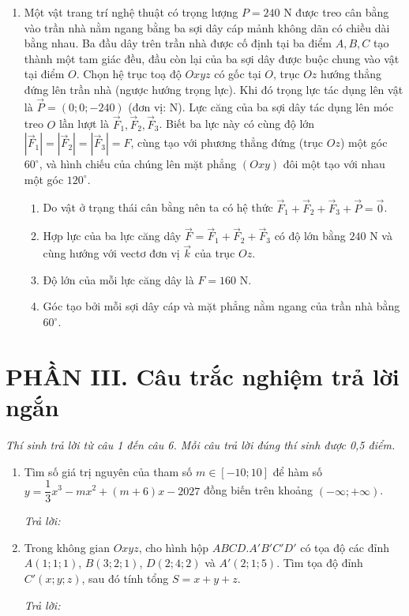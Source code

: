 \documentclass[12pt,a4paper]{article}
\newcommand{\otraloi}{\par\nobreak\smallskip\noindent\textit{Trả lời:}\quad\fbox{\rule{0pt}{11pt}\makebox[0.3cm]{}}\,\fbox{\rule{0pt}{11pt}\makebox[0.3cm]{}}\,\fbox{\rule{0pt}{11pt}\makebox[0.3cm]{}}\,\fbox{\rule{0pt}{11pt}\makebox[0.3cm]{}}}
\begin{document}
\begin{enumerate}[start=2]
\item Một vật trang trí nghệ thuật có trọng lượng $P=240\text{ N}$ được treo cân bằng vào trần nhà nằm ngang bằng ba sợi dây cáp mảnh không dãn có chiều dài bằng nhau. Ba đầu dây trên trần nhà được cố định tại ba điểm $A, B, C$ tạo thành một tam giác đều, đầu còn lại của ba sợi dây được buộc chung vào vật tại điểm $O$. Chọn hệ trục toạ độ $Oxyz$ có gốc tại $O$, trục $Oz$ hướng thẳng đứng lên trần nhà (ngược hướng trọng lực). Khi đó trọng lực tác dụng lên vật là $\vec{P}=(0;0;-240)$ (đơn vị: N). Lực căng của ba sợi dây tác dụng lên móc treo $O$ lần lượt là $\vec{F}_1, \vec{F}_2, \vec{F}_3$. Biết ba lực này có cùng độ lớn $|\vec{F}_1|=|\vec{F}_2|=|\vec{F}_3|=F$, cùng tạo với phương thẳng đứng (trục $Oz$) một góc $60^\circ$, và hình chiếu của chúng lên mặt phẳng $(Oxy)$ đôi một tạo với nhau một góc $120^\circ$.
\begin{enumerate}
\item Do vật ở trạng thái cân bằng nên ta có hệ thức $\vec{F}_1+\vec{F}_2+\vec{F}_3+\vec{P}=\vec{0}$.
\item Hợp lực của ba lực căng dây $\vec{F}=\vec{F}_1+\vec{F}_2+\vec{F}_3$ có độ lớn bằng $240\text{ N}$ và cùng hướng với vectơ đơn vị $\vec{k}$ của trục $Oz$.
\item Độ lớn của mỗi lực căng dây là $F=160\text{ N}$.
\item Góc tạo bởi mỗi sợi dây cáp và mặt phẳng nằm ngang của trần nhà bằng $60^\circ$.
\end{enumerate}
\end{enumerate}

\vspace{3pt}
\section*{\large PHẦN III. Câu trắc nghiệm trả lời ngắn}
\textit{Thí sinh trả lời từ câu 1 đến câu 6. Mỗi câu trả lời đúng thí sinh được 0,5 điểm.}
\begin{enumerate}
\item Tìm số giá trị nguyên của tham số $m\in[-10;10]$ để hàm số $y=\dfrac{1}{3}x^3-mx^2+(m+6)x-2027$ đồng biến trên khoảng $(-\infty;+\infty)$.
\otraloi

\item Trong không gian $Oxyz$, cho hình hộp $ABCD.A'B'C'D'$ có tọa độ các đỉnh $A(1;1;1)$, $B(3;2;1)$, $D(2;4;2)$ và $A'(2;1;5)$. Tìm tọa độ đỉnh $C'(x;y;z)$, sau đó tính tổng $S=x+y+z$.
\otraloi
\end{enumerate}
\end{document}
